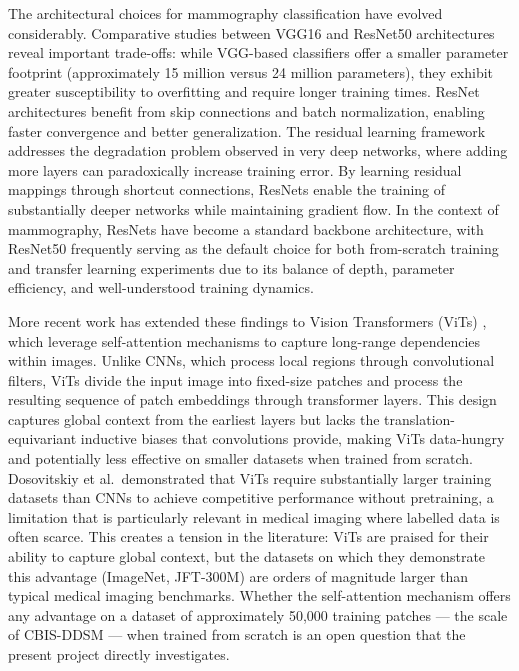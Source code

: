 \documentclass[justified,notoc,openany]{tufte-book}
\begin{document}
The architectural choices for mammography classification have evolved considerably. Comparative studies between VGG16 and ResNet50 architectures reveal important trade-offs: while VGG-based classifiers offer a smaller parameter footprint (approximately 15 million versus 24 million parameters), they exhibit greater susceptibility to overfitting and require longer training times. ResNet architectures \cite{He2016} benefit from skip connections and batch normalization, enabling faster convergence and better generalization. The residual learning framework addresses the degradation problem observed in very deep networks, where adding more layers can paradoxically increase training error. By learning residual mappings through shortcut connections, ResNets enable the training of substantially deeper networks while maintaining gradient flow. In the context of mammography, ResNets have become a standard backbone architecture, with ResNet50 frequently serving as the default choice for both from-scratch training and transfer learning experiments due to its balance of depth, parameter efficiency, and well-understood training dynamics.

More recent work has extended these findings to Vision Transformers (ViTs) \cite{Dosovitskiy2021}, which leverage self-attention mechanisms to capture long-range dependencies within images. Unlike CNNs, which process local regions through convolutional filters, ViTs divide the input image into fixed-size patches and process the resulting sequence of patch embeddings through transformer layers. This design captures global context from the earliest layers but lacks the translation-equivariant inductive biases that convolutions provide, making ViTs data-hungry and potentially less effective on smaller datasets when trained from scratch. Dosovitskiy et al.~demonstrated that ViTs require substantially larger training datasets than CNNs to achieve competitive performance without pretraining, a limitation that is particularly relevant in medical imaging where labelled data is often scarce. This creates a tension in the literature: ViTs are praised for their ability to capture global context, but the datasets on which they demonstrate this advantage (ImageNet, JFT-300M) are orders of magnitude larger than typical medical imaging benchmarks. Whether the self-attention mechanism offers any advantage on a dataset of approximately 50,000 training patches --- the scale of CBIS-DDSM --- when trained from scratch is an open question that the present project directly investigates.
\end{document}
